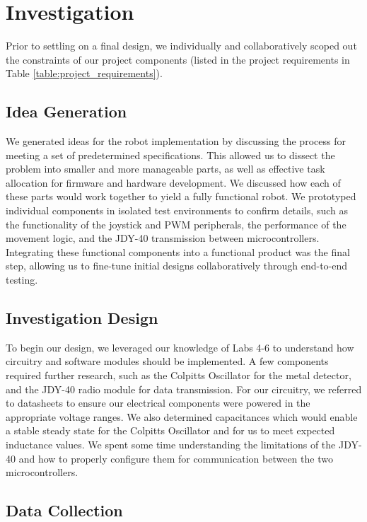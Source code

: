 \documentclass{article}
\begin{document}
\section{Investigation}

Prior to settling on a final design, we individually and collaboratively scoped out the
constraints of our project components (listed in the project requirements in Table \ref{table:project_requirements}).

\subsection{Idea Generation}

We generated ideas for the robot implementation by discussing the process for meeting a set of predetermined specifications.
This allowed us to dissect the problem into smaller and more manageable parts, as well as effective task allocation for firmware and
hardware development. We discussed how each of these parts would work together to yield a fully functional robot. We prototyped individual components
in isolated test environments to confirm details, such as the functionality of the joystick and PWM peripherals, the performance of the movement logic,
and the JDY-40 transmission between microcontrollers. Integrating these functional components into a functional product was the
final step, allowing us to fine-tune initial designs collaboratively through end-to-end testing.

\subsection{Investigation Design}

To begin our design, we leveraged our knowledge of Labs 4-6 to understand how circuitry and software modules should be implemented.
A few components required further research, such as the Colpitts Oscillator for the metal detector, and the JDY-40 radio module for data transmission. %
For our circuitry, we referred to datasheets to ensure our electrical components were powered in the appropriate voltage ranges.
We also determined capacitances which would enable a stable steady state for the Colpitts Oscillator and for us to meet expected inductance values.
We spent some time understanding the limitations of the JDY-40 and how to properly configure them for communication between the two microcontrollers.

\subsection{Data Collection}
\end{document}

